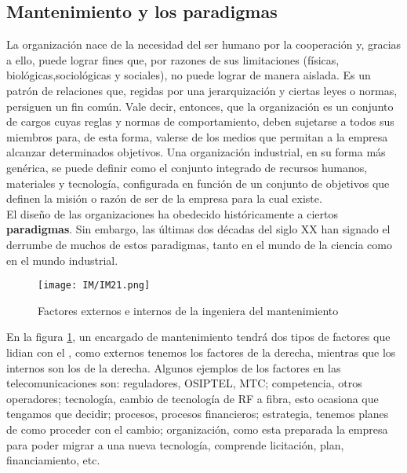 \documentclass[
	12pt, %
	fleqn, %
	a4paper, %
	oneside, %
]{LegrandOrangeBook}
\begin{document}
\subsection*{Mantenimiento y los paradigmas}
La organización nace de la necesidad del ser humano por la cooperación y, gracias a ello, puede lograr fines que, por razones de sus limitaciones (físicas, biológicas,sociológicas y sociales), no puede lograr de manera aislada. Es un patrón de relaciones que, regidas por una jerarquización y ciertas leyes o normas, persiguen un fin común. Vale decir, entonces, que la organización es un conjunto de cargos cuyas reglas y normas de comportamiento, deben sujetarse a todos sus miembros para, de esta forma, valerse de los medios que permitan a la empresa alcanzar determinados objetivos. Una organización industrial, en su forma más genérica, se puede definir como el conjunto integrado de recursos humanos, materiales y tecnología, configurada en función de un conjunto de objetivos que definen la misión o razón de ser de la empresa para la cual existe.\\
El diseño de las organizaciones ha obedecido históricamente a ciertos \textbf{paradigmas}.
Sin embargo, las últimas dos décadas del siglo XX han signado el derrumbe de
muchos de estos paradigmas, tanto en el mundo de la ciencia como en el mundo industrial.
\begin{figure}[H]
\centering
\texttt{[image: IM/IM21.png]}
\caption{Factores externos e internos de la ingeniera del mantenimiento}
\label{fig:Factores mantenimiento}
\end{figure}
En la figura \ref{fig:Factores mantenimiento}, un encargado de mantenimiento tendrá dos tipos de factores que lidian con el , como externos tenemos los factores de la derecha, mientras que los internos son los de la derecha. Algunos ejemplos de los factores en las telecomunicaciones son: reguladores, OSIPTEL, MTC; competencia, otros operadores; tecnología, cambio de tecnología de RF a fibra, esto ocasiona que tengamos que decidir; procesos, procesos financieros; estrategia, tenemos planes de como proceder con el cambio; organización, como esta preparada la empresa para poder migrar a una nueva tecnología, comprende licitación, plan, financiamiento, etc.
\end{document}

